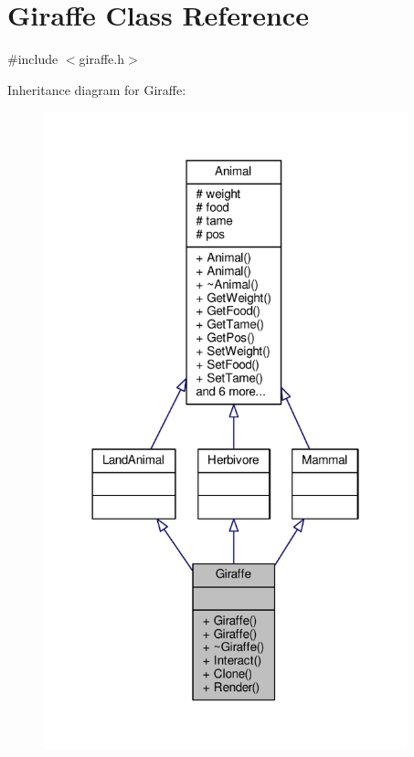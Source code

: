 \hypertarget{classGiraffe}{}\section{Giraffe Class Reference}
\label{classGiraffe}


{\ttfamily \#include $<$giraffe.\+h$>$}



Inheritance diagram for Giraffe\+:
\nopagebreak
\begin{figure}[H]
\begin{center}
\leavevmode
\includegraphics[width=298pt]{classGiraffe__inherit__graph}
\end{center}
\end{figure}


